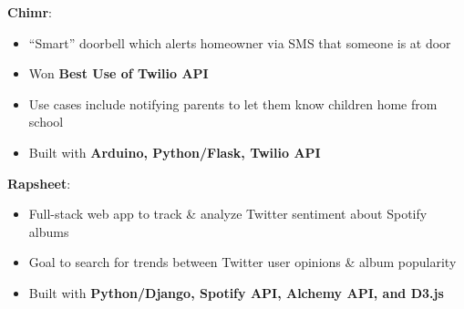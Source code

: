\documentclass[margin]{res}
\begin{document}
\begin{resume}
\textbf{Chimr}:
\begin{itemize}
  \item ``Smart'' doorbell which alerts homeowner via SMS that someone is at door
  \item Won \textbf{Best Use of Twilio API}
  \item Use cases include notifying parents to let them know children home from school
  \item Built with \textbf{Arduino, Python/Flask, Twilio API}
\end{itemize}

\par
\textbf{Rapsheet}:
\begin{itemize}
  \item Full-stack web app to track \& analyze Twitter sentiment about Spotify albums
  \item Goal to search for trends between Twitter user opinions \& album popularity
  \item Built with \textbf{Python/Django, Spotify API, Alchemy API, and D3.js}
\end{itemize}


\end{resume}
\end{document}
